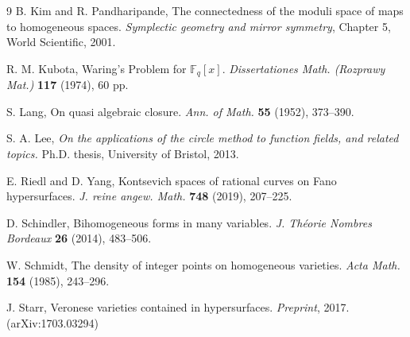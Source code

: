 \documentclass[12pt, reqno]{amsart}
\numberwithin{equation}{section}
\newcommand{\0}{\mathbf{0}}
\newcommand{\FF}{\mathbb{F}}
\renewcommand{\=}{\equiv}
\newcommand{\1}{\mathbf{1}}
\theoremstyle{definition}
\begin{document}
\begin{thebibliography}{9}
B. Kim and R. Pandharipande, The connectedness of the moduli space of maps to homogeneous spaces. {\em Symplectic geometry and mirror symmetry}, Chapter 5, World Scientific, 2001.


 R. M. Kubota, Waring’s Problem for $\FF_q[x]$. {\em Dissertationes Math. (Rozprawy Mat.)}
{\bf 117} (1974), 60 pp.

S. Lang, On quasi algebraic closure. {\em Ann. of Math.} {\bf 55} (1952), 373--390.


S. A. Lee,
{\em On the applications of the circle method to function fields, and related topics. }
Ph.D. thesis, University of Bristol, 2013.



E. Riedl and D. Yang,  Kontsevich spaces of rational curves on Fano hypersurfaces. {\em J. reine angew. Math.} {\bf 748} (2019), 207--225.



 D. Schindler, Bihomogeneous forms in many variables. {\em J. Th\'{e}orie Nombres Bordeaux} {\bf 26} (2014), 483--506.




 W. Schmidt, The density of integer points on homogeneous varieties.
{\em Acta Math.} {\bf 154} (1985), 243--296.


J. Starr,
Veronese varieties contained in hypersurfaces. {\em Preprint}, 2017. (arXiv:1703.03294)





\end{thebibliography}
\end{document}
